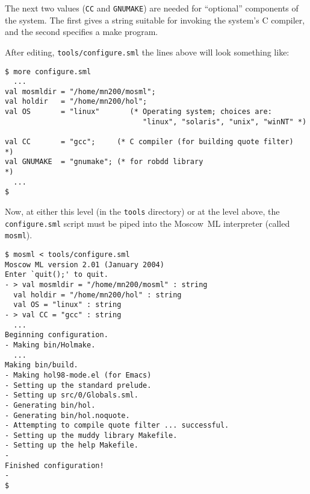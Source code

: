 The next two values (\texttt{CC} and \texttt{GNUMAKE}) are needed for
``optional'' components of the system.  The first gives a string
suitable for invoking the system's C compiler, and the second
specifies a \textsf{make} program.

After editing, \texttt{tools/configure.sml} the lines above will look
something like:

\begin{session}
\begin{verbatim}
$ more configure.sml
  ...
val mosmldir = "/home/mn200/mosml";
val holdir   = "/home/mn200/hol";
val OS       = "linux"       (* Operating system; choices are:
                                "linux", "solaris", "unix", "winNT" *)

val CC       = "gcc";     (* C compiler (for building quote filter)        *)
val GNUMAKE  = "gnumake"; (* for robdd library                             *)
  ...
$
\end{verbatim}
\end{session}

\noindent Now, at either this level (in the \texttt{tools} directory)
or at the level above, the \texttt{configure.sml} script must be piped
into the Moscow~ML interpreter (called \texttt{mosml}).

\begin{session}
\begin{verbatim}
$ mosml < tools/configure.sml
Moscow ML version 2.01 (January 2004)
Enter `quit();' to quit.
- > val mosmldir = "/home/mn200/mosml" : string
  val holdir = "/home/mn200/hol" : string
  val OS = "linux" : string
- > val CC = "gcc" : string
  ...
Beginning configuration.
- Making bin/Holmake.
  ...
Making bin/build.
- Making hol98-mode.el (for Emacs)
- Setting up the standard prelude.
- Setting up src/0/Globals.sml.
- Generating bin/hol.
- Generating bin/hol.noquote.
- Attempting to compile quote filter ... successful.
- Setting up the muddy library Makefile.
- Setting up the help Makefile.
-
Finished configuration!
-
$
\end{verbatim}
\end{session}



